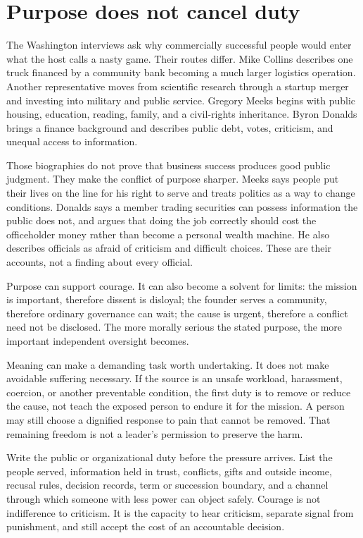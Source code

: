 \section{Purpose does not cancel duty}

The Washington interviews ask why commercially successful people would enter
what the host calls a nasty game. Their routes differ. Mike Collins describes
one truck financed by a community bank becoming a much larger logistics
operation. Another representative moves from scientific research through a
startup merger and investing into military and public service. Gregory Meeks
begins with public housing, education, reading, family, and a civil-rights
inheritance. Byron Donalds brings a finance background and describes public
debt, votes, criticism, and unequal access to information.

Those biographies do not prove that business success produces good public
judgment. They make the conflict of purpose sharper. Meeks says people put
their lives on the line for his right to serve and treats politics as a way to
change conditions. Donalds says a member trading securities can possess
information the public does not, and argues that doing the job correctly
should cost the officeholder money rather than become a personal wealth
machine. He also describes officials as afraid of criticism and difficult
choices. These are their accounts, not a finding about every official.

Purpose can support courage. It can also become a solvent for limits: the
mission is important, therefore dissent is disloyal; the founder serves a
community, therefore ordinary governance can wait; the cause is urgent,
therefore a conflict need not be disclosed. The more morally serious the
stated purpose, the more important independent oversight becomes.

Meaning can make a demanding task worth undertaking. It does not make
avoidable suffering necessary. If the source is an unsafe workload,
harassment, coercion, or another preventable condition, the first duty is to
remove or reduce the cause, not teach the exposed person to endure it for the
mission. A person may still choose a dignified response to pain that cannot be
removed. That remaining freedom is not a leader's permission to preserve the
harm.

Write the public or organizational duty before the pressure arrives. List the
people served, information held in trust, conflicts, gifts and outside income,
recusal rules, decision records, term or succession boundary, and a channel
through which someone with less power can object safely. Courage is not
indifference to criticism. It is the capacity to hear criticism, separate
signal from punishment, and still accept the cost of an accountable decision.

